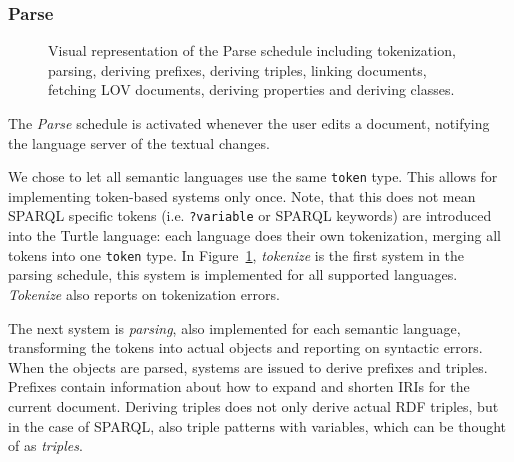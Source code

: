 \subsubsection{Parse}

\begin{figure}[tb]
 \centering
  \caption{Visual representation of the Parse schedule including tokenization, parsing, deriving prefixes, deriving triples, linking documents, fetching LOV documents, deriving properties and deriving classes. }\label{fig:Parse}
\end{figure}

The \textit{Parse} schedule %
is activated whenever the user edits a document, notifying the language server of the textual changes.

We chose to let all semantic languages use the same \texttt{token} type. 
This allows for implementing token-based systems only once.
Note, that this does not mean SPARQL specific tokens (i.e. \texttt{?variable} or SPARQL keywords) are introduced into the Turtle language:  each language does their own tokenization, merging all tokens into one \texttt{token} type.
In Figure~\ref{fig:Parse}, \textit{tokenize} is the first system in the parsing schedule, this system is implemented for all supported languages. \textit{Tokenize} also reports on tokenization errors.

The next system is \textit{parsing}, also implemented for each semantic language, transforming the tokens into actual objects and reporting on syntactic errors. 
When the objects are parsed, systems are issued to derive prefixes and triples. 
Prefixes contain information about how to expand and shorten IRIs for the current document.
Deriving triples does not only derive actual RDF triples, but in the case of SPARQL, also triple patterns with variables, which can be thought of as \textit{triples}.

